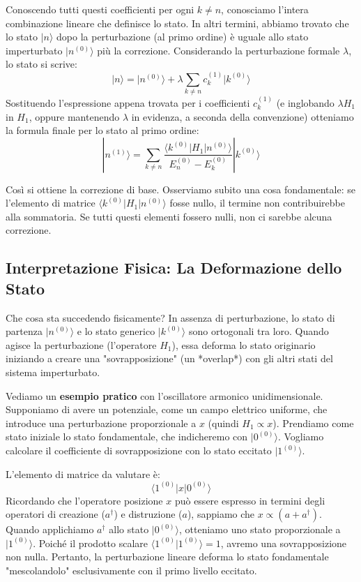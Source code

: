 Conoscendo tutti questi coefficienti per ogni $k \neq n$, conosciamo l'intera combinazione lineare che definisce lo stato.
In altri termini, abbiamo trovato che lo stato $\vert{}n\rangle$ dopo la perturbazione (al primo ordine) è uguale allo stato imperturbato $\vert{}n^{(0)}\rangle$ più la correzione. Considerando la perturbazione formale $\lambda$, lo stato si scrive:
\begin{equation}
|n\rangle = |n^{(0)}\rangle + \lambda \sum_{k \neq n} c_k^{(1)} |k^{(0)}\rangle
\end{equation}
Sostituendo l'espressione appena trovata per i coefficienti $c_k^{(1)}$ (e inglobando $\lambda H_1$ in $H_1$, oppure mantenendo $\lambda$ in evidenza, a seconda della convenzione) otteniamo la formula finale per lo stato al primo ordine:
\begin{equation}
|n^{(1)}\rangle = \sum_{k \neq n} \frac{\langle k^{(0)} | H_1 | n^{(0)} \rangle}{E_n^{(0)} - E_k^{(0)}} |k^{(0)}\rangle
\end{equation}

Così si ottiene la correzione di base. Osserviamo subito una cosa fondamentale: se l'elemento di matrice $\langle k^{(0)} \vert{} H_1 \vert{} n^{(0)} \rangle$ fosse nullo, il termine non contribuirebbe alla sommatoria. Se tutti questi elementi fossero nulli, non ci sarebbe alcuna correzione.

\subsection{Interpretazione Fisica: La Deformazione dello Stato}
Che cosa sta succedendo fisicamente?
In assenza di perturbazione, lo stato di partenza $\vert{}n^{(0)}\rangle$ e lo stato generico $\vert{}k^{(0)}\rangle$ sono ortogonali tra loro. Quando agisce la perturbazione (l'operatore $H_1$), essa deforma lo stato originario iniziando a creare una "sovrapposizione" (un *overlap*) con gli altri stati del sistema imperturbato.

Vediamo un \textbf{esempio pratico} con l'oscillatore armonico unidimensionale.
Supponiamo di avere un potenziale, come un campo elettrico uniforme, che introduce una perturbazione proporzionale a $x$ (quindi $H_1 \propto x$).
Prendiamo come stato iniziale lo stato fondamentale, che indicheremo con $\vert{}0^{(0)}\rangle$. Vogliamo calcolare il coefficiente di sovrapposizione con lo stato eccitato $\vert{}1^{(0)}\rangle$.

L'elemento di matrice da valutare è:
\begin{equation}
\langle 1^{(0)} | x | 0^{(0)} \rangle
\end{equation}
Ricordando che l'operatore posizione $x$ può essere espresso in termini degli operatori di creazione ($a^\dagger$) e distruzione ($a$), sappiamo che $x \propto (a + a^\dagger)$. Quando applichiamo $a^\dagger$ allo stato $\vert{}0^{(0)}\rangle$, otteniamo uno stato proporzionale a $\vert{}1^{(0)}\rangle$. Poiché il prodotto scalare $\langle 1^{(0)} \vert{} 1^{(0)} \rangle = 1$, avremo una sovrapposizione non nulla. Pertanto, la perturbazione lineare deforma lo stato fondamentale "mescolandolo" esclusivamente con il primo livello eccitato.

